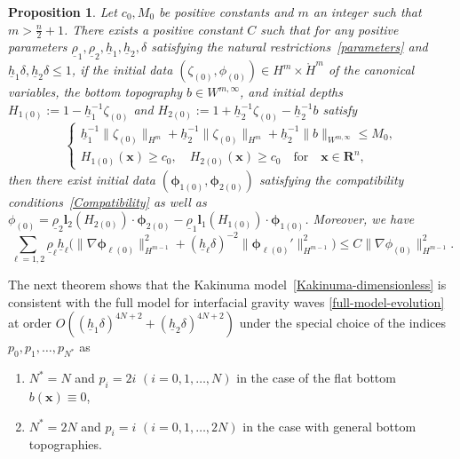 \documentclass[11pt,leqno]{article}
\newtheorem{proposition}[theorem]{\bf Proposition}
\numberwithin{equation}{section}
\numberwithin{figure}{section}
\begin{document}
\begin{proposition}\label{preparation-ini}
Let $c_0, M_0$ be positive constants and $m$ an integer such that $m>\frac{n}{2}+1$. 
There exists a positive constant $C$ such that for any positive parameters 
$\underline{\rho}_1, \underline{\rho}_2, \underline{h}_1, \underline{h}_2, \delta$ satisfying the natural 
restrictions~\eqref{parameters} and $\underline{h}_1\delta, \underline{h}_2\delta \leq 1$, 
if the initial data $(\zeta_{(0)},\phi_{(0)})\in H^m\times\mathring{H}^m$ of the canonical variables, 
the bottom topography $b\in W^{m,\infty}$, and initial depths $H_{1(0)} := 1 - \underline{h}_1^{-1}\zeta_{(0)}$ and 
$H_{2(0)} := 1 + \underline{h}_2^{-1}\zeta_{(0)} - \underline{h}_2^{-1}b$ satisfy 
%
\[
\begin{cases}
 \underline{h}_1^{-1}\|\zeta_{(0)}\|_{H^m} + \underline{h}_2^{-1}\|\zeta_{(0)}\|_{H^m}
  + \underline{h}_2^{-1}\|b\|_{W^{m,\infty}} \leq M_0, \\
 H_{1(0)}(\bm{x}) \geq c_0, \quad H_{2(0)}(\bm{x}) \geq c_0
  \quad\mbox{for}\quad \bm{x}\in\mathbf{R}^n,
\end{cases}
\]
%
then there exist initial data $(\bm{\phi}_{1(0)},\bm{\phi}_{2(0)})$ satisfying the compatibility 
conditions~\eqref{Compatibility} as well as 
$\phi_{(0)} = \underline{\rho}_2\bm{l}_2(H_{2(0)})\cdot\bm{\phi}_{2(0)}
 - \underline{\rho}_1\bm{l}_1(H_{1(0)})\cdot\bm{\phi}_{1(0)}$. 
Moreover, we have 
%
\[
\sum_{\ell=1,2}\underline{\rho}_\ell\underline{h}_\ell\bigl(
 \|\nabla\bm{\phi}_{\ell(0)}\|_{H^{m-1}}^2 + (\underline{h}_\ell\delta)^{-2}\|\bm{\phi}_{\ell(0)}'\|_{H^{m-1}}^2\bigr)
\leq C\|\nabla\phi_{(0)}\|_{H^{m-1}}^2.
\]
\end{proposition}


The next theorem shows that the Kakinuma model~\eqref{Kakinuma-dimensionless} is consistent with the full model for interfacial gravity waves 
\eqref{full-model-evolution} at order $O((\underline{h}_1\delta)^{4N+2}+(\underline{h}_2\delta)^{4N+2})$ under the special choice of the 
indices $p_0,p_1,\ldots,p_{N^*}$ as 
%
\begin{enumerate}
\item[(H1)]
$N^*=N$ and $p_i=2i$ $(i=0,1,\ldots,N)$ in the case of the flat bottom $b(\bm{x})\equiv0$, 
%
\item[(H2)]
$N^*=2N$ and $p_i=i$ $(i=0,1,\ldots,2N)$ in the case with general bottom topographies. 
\end{enumerate}
\end{document}
